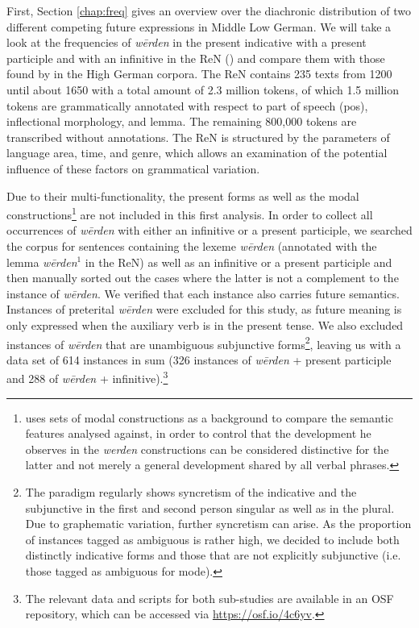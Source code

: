 \documentclass[output=paper,colorlinks,citecolor=brown]{langscibook}
\begin{document}
First, Section \ref{chap:freq} gives an overview over the diachronic distribution of two different competing future expressions in Middle Low German. We will take a look at the frequencies of \textit{wērden} in the present indicative with a present participle and with an infinitive in the ReN (\cite{ReNTeam2021})  and compare them with those found by \citet{Hartmann2021} in the High German corpora. The ReN contains 235 texts from 1200 until about 1650 with a total amount of 2.3 million tokens, of which 1.5 million tokens are grammatically annotated with respect to part of speech (pos), inflectional morphology, and lemma. The remaining 800,000 tokens are transcribed without annotations.
The ReN is structured by the parameters of language area, time, and genre, which allows an examination of the potential influence of these factors on grammatical variation.

Due to their multi-functionality, the present forms as well as the modal constructions\footnote{\citet{Hartmann2021} uses sets of modal constructions as a background to compare the semantic features analysed against, in order to control that the development he observes in the \textit{werden} constructions can be considered distinctive for the latter and not merely a general development shared by all verbal phrases.} are not included in this first analysis. In order to collect all occurrences of \textit{wērden} with either an infinitive or a present participle, we searched the corpus for sentences containing the lexeme \textit{wērden} (annotated with the lemma \textit{wērden$^1$} in the ReN) as well as an infinitive or a present participle and then manually sorted out the cases where the latter is not a complement to the instance of \textit{wērden}. We verified that each instance also carries future semantics. Instances of preterital \textit{wērden} were excluded for this study, as future meaning is only expressed when the auxiliary verb is in the present tense. We also excluded instances of \textit{wērden} that are unambiguous subjunctive forms\footnote{The paradigm regularly shows syncretism of the indicative and the subjunctive in the first and second person singular as well as in the plural. Due to graphematic variation, further syncretism can arise. As the proportion of instances tagged as ambiguous is rather high, we decided to include both distinctly indicative forms and those that are not explicitly subjunctive (i.e. those tagged as ambiguous for mode).}, leaving us with a data set of 614 instances in sum (326 instances of \textit{wērden} + present participle and 288 of \textit{wērden} + infinitive).\footnote{The relevant data and scripts for both sub-studies are available in an OSF repository, which can be accessed via \href{https://osf.io/4c6yv }{https://osf.io/4c6yv}.}
\end{document}
